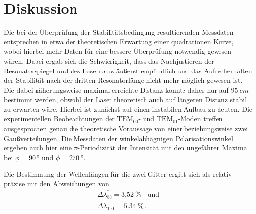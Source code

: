 \section{Diskussion}
\label{sec:Diskussion}

Die bei der Überprüfung der Stabilitätsbedingung resultierenden Messdaten entsprechen in etwa der theoretischen Erwartung
einer quadrationen Kurve, wobei hierbei mehr Daten für eine bessere Überprüfung notwendig gewesen wären.
Dabei ergab sich die Schwierigkeit, 
dass das Nachjustieren der Resonatorspiegel und des Laserrohrs äußerst empfindlich
und das Aufrecherhalten der Stabilität nach der dritten Resonatorlänge nicht mehr möglich gewesen ist.
Die dabei näherungsweise maximal erreichte Distanz konnte daher nur auf $\qty{95}{cm}$ bestimmt werden, 
obwohl der Laser theoretisch auch auf längeren Distanz stabil zu erwarten wäre. 
Hierbei ist zunächst auf einen instabilen Aufbau zu deuten. 
Die experimentellen Beobeachtungen der $\text{TEM}_{00}$- und $\text{TEM}_{01}$-Moden treffen ausgesprochen genau die
theoretische Voraussage von einer beziehungsweise zwei Gaußverteilungen.
Die Messdaten der winkelabhägnigen Polarisationswinkel ergeben auch hier eine $\pi$-Periodizität der Intensität
mit den ungefähren Maxima bei $\phi = \qty{90}{\degree}$ und $\phi = \qty{270}{\degree}$.

Die Bestimmung der Wellenlängen für die zwei Gitter ergibt sich als relativ präzise mit den Abweichungen von
\begin{align*}
    \Delta \bar{\lambda_{80}} = \qty{3.52}{\percent} \quad \text{und} \\
    \Delta \bar{\lambda_{100}} = \qty{5.34}{\percent} \, .
\end{align*}